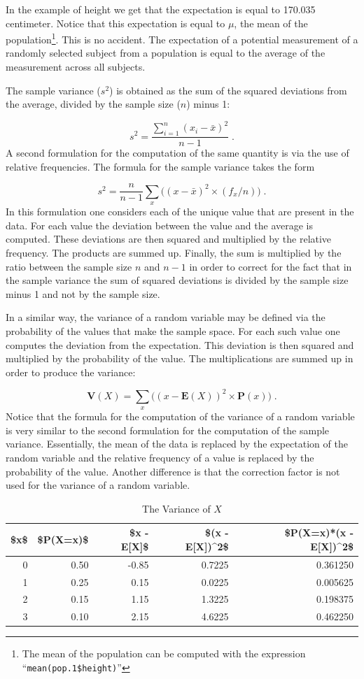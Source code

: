 \documentclass[]{krantz}
\newcommand{\Expec}{\mathbf{E}}
\newcommand{\Prob}{\mathbf{P}}
\newcommand{\Var}{\mathbf{V}}
\theoremstyle{definition}
\theoremstyle{definition}
\theoremstyle{definition}
\theoremstyle{remark}
\begin{document}
In the example of height we get that the expectation is equal to 170.035
centimeter. Notice that this expectation is equal to \(\mu\), the mean of
the population\footnote{The mean of the population can be computed with the expression
  ``\texttt{mean(pop.1\$height)}''}. This is no accident. The expectation of a potential
measurement of a randomly selected subject from a population is equal to
the average of the measurement across all subjects.

The sample variance (\(s^2\)) is obtained as the sum of the squared
deviations from the average, divided by the sample size (\(n\)) minus 1:

\[s^2 = \frac{\sum_{i=1}^n (x_i - \bar x)^2}{n-1}\;.\] A second
formulation for the computation of the same quantity is via the use of
relative frequencies. The formula for the sample variance takes the form

\[s^2 = \frac{n}{n-1}\sum_x \big((x - \bar x)^2\times (f_x/n)\big)\;.\]
In this formulation one considers each of the unique value that are
present in the data. For each value the deviation between the value and
the average is computed. These deviations are then squared and
multiplied by the relative frequency. The products are summed up.
Finally, the sum is multiplied by the ratio between the sample size \(n\)
and \(n-1\) in order to correct for the fact that in the sample variance
the sum of squared deviations is divided by the sample size minus 1 and
not by the sample size.

In a similar way, the variance of a random variable may be defined via
the probability of the values that make the sample space. For each such
value one computes the deviation from the expectation. This deviation is
then squared and multiplied by the probability of the value. The
multiplications are summed up in order to produce the variance:

\[\Var(X) = \sum_x\big( (x-\Expec(X))^2 \times \Prob(x)\big)\;.\] Notice
that the formula for the computation of the variance of a random
variable is very similar to the second formulation for the computation
of the sample variance. Essentially, the mean of the data is replaced by
the expectation of the random variable and the relative frequency of a
value is replaced by the probability of the value. Another difference is
that the correction factor is not used for the variance of a random
variable.

\begin{table}[t]

\caption{\label{tab:tab3}The Variance of $X$}
\centering
\begin{tabular}{rrrrr}
\toprule
\$x\$ & \$P(X=x)\$ & \$x - E[X]\$ & \$(x - E[X])\textasciicircum{}2\$ & \$P(X=x)*(x - E[X])\textasciicircum{}2\$\\
\midrule
0 & 0.50 & -0.85 & 0.7225 & 0.361250\\
1 & 0.25 & 0.15 & 0.0225 & 0.005625\\
2 & 0.15 & 1.15 & 1.3225 & 0.198375\\
3 & 0.10 & 2.15 & 4.6225 & 0.462250\\
\bottomrule
\end{tabular}
\end{table}
\end{document}
